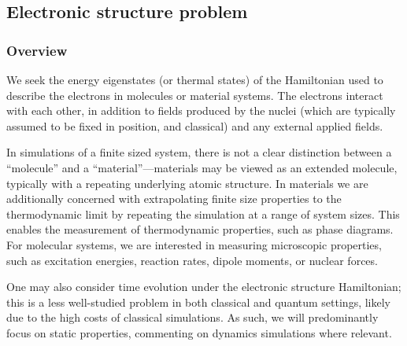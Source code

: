 \begin{refsection}

\subsection{Electronic structure problem}\label{appl:ElectronicStructure} 

\subsubsection*{Overview}
We seek the energy eigenstates (or thermal states) of the Hamiltonian used to describe the electrons in molecules or material systems. The electrons interact with each other, in addition to fields produced by the nuclei (which are typically assumed to be fixed in position, and classical) and any external applied fields.

In simulations of a finite sized system, there is not a clear distinction between a ``molecule'' and a ``material''---materials may be viewed as an extended molecule, typically with a repeating underlying atomic structure. In materials we are additionally concerned with extrapolating finite size properties to the thermodynamic limit by repeating the simulation at a range of system sizes. This enables the measurement of thermodynamic properties, such as phase diagrams.
For molecular systems, we are interested in measuring microscopic properties, such as excitation energies, reaction rates, dipole moments, or nuclear forces. 

One may also consider time evolution under the electronic structure Hamiltonian; this is a less well-studied problem in both classical and quantum settings, likely due to the high costs of classical simulations. As such, we will predominantly focus on static properties, commenting on dynamics simulations where relevant.





\end{refsection}

